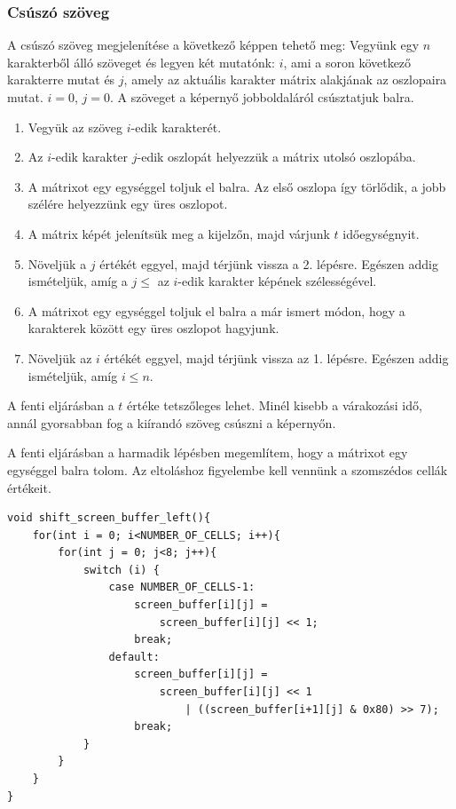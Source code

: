 \documentclass[a4paper, 12pt]{article}
\begin{document}
\subsubsection{Csúszó szöveg} \label{csuszo}
A csúszó szöveg megjelenítése a következő képpen tehető meg:
Vegyünk egy $n$ karakterből álló szöveget és legyen két mutatónk: $i$, ami a soron következő karakterre mutat és $j$, amely az aktuális karakter mátrix alakjának az oszlopaira mutat. $i = 0$, $j = 0$.
A szöveget a képernyő jobboldaláról csúsztatjuk balra.
\begin{enumerate}
	\item Vegyük az szöveg $i$-edik karakterét.
	\item Az $i$-edik karakter $j$-edik oszlopát helyezzük a mátrix utolsó oszlopába.
	\item A mátrixot egy egységgel toljuk el balra. Az első oszlopa így törlődik, a jobb szélére helyezzünk egy üres oszlopot.
	\item A mátrix képét jelenítsük meg a kijelzőn, majd várjunk $t$ időegységnyit.
	\item Növeljük a $j$ értékét eggyel, majd térjünk vissza a 2. lépésre. Egészen addig ismételjük, amíg a $j \leq$ az $i$-edik karakter képének szélességével.
	\item A mátrixot egy egységgel toljuk el balra a már ismert módon, hogy a karakterek között egy üres oszlopot hagyjunk.
	\item Növeljük az $i$ értékét eggyel, majd térjünk vissza az 1. lépésre. Egészen addig ismételjük, amíg $i \leq n$.
\end{enumerate}

A fenti eljárásban a $t$ értéke tetszőleges lehet. Minél kisebb a várakozási idő, annál gyorsabban fog a kiírandó szöveg csúszni a képernyőn.

A fenti eljárásban a harmadik lépésben megemlítem, hogy a mátrixot egy egységgel balra tolom. Az eltoláshoz figyelembe kell vennünk a szomszédos cellák értékeit.

\begin{lstlisting}[style=CStyle]
void shift_screen_buffer_left(){
	for(int i = 0; i<NUMBER_OF_CELLS; i++){
		for(int j = 0; j<8; j++){
			switch (i) {
				case NUMBER_OF_CELLS-1:
					screen_buffer[i][j] =
						screen_buffer[i][j] << 1;
					break;
				default:
					screen_buffer[i][j] =
						screen_buffer[i][j] << 1
							| ((screen_buffer[i+1][j] & 0x80) >> 7);
					break;
			}
		}
	}
}
\end{lstlisting}
\end{document}
